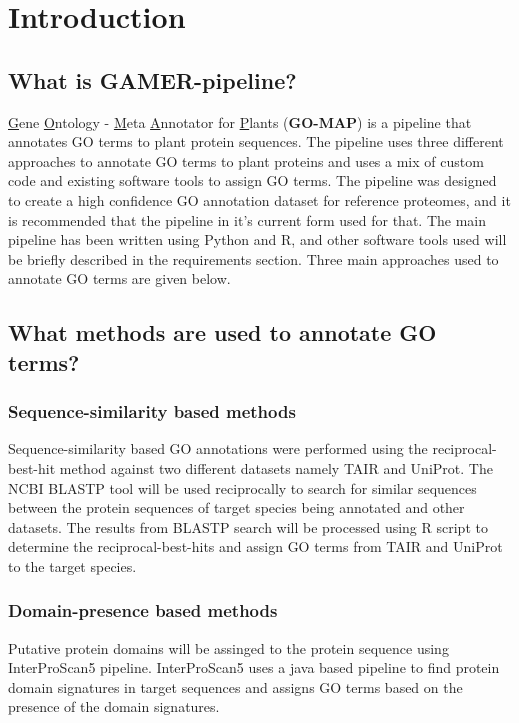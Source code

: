 \section{Introduction}

\subsection{What is GAMER-pipeline?}
\underline{G}ene \underline{O}ntology - \underline{M}eta \underline{A}nnotator for \underline{P}lants (\textbf{GO-MAP}) is a pipeline that annotates GO terms to plant protein sequences. The pipeline uses three different approaches to annotate GO terms to plant proteins and uses a mix of custom code and existing software tools to assign GO terms. The pipeline was designed to create a high confidence GO annotation dataset for reference proteomes, and it is recommended that the pipeline in it's current form used for that. The main pipeline has been written using Python and R, and other software tools used will be briefly described in the requirements section. Three main approaches used to annotate GO terms are given below.

\subsection{What methods are used to annotate GO terms?}
\subsubsection{Sequence-similarity based methods}
Sequence-similarity based GO annotations were performed using the reciprocal-best-hit method against two different datasets namely TAIR and UniProt. The NCBI BLASTP tool will be used reciprocally to search for similar sequences between the protein sequences of target species being annotated and other datasets. The results from BLASTP search will be processed using R script to determine the reciprocal-best-hits and assign GO terms from TAIR and UniProt to the target species.

\subsubsection{Domain-presence based methods}
Putative protein domains will be assinged to the protein sequence using InterProScan5 pipeline. InterProScan5 uses a java based pipeline to find protein domain signatures in target sequences and assigns GO terms based on the presence of the domain signatures.

